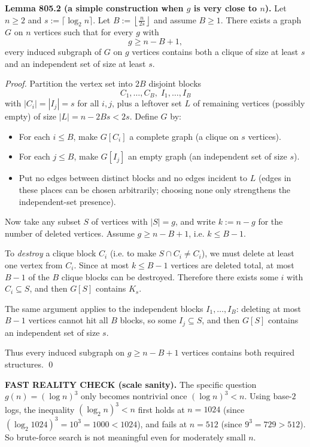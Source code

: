 \textbf{Lemma 805.2 (a simple construction when $g$ is very close to $n$).}
Let $n\ge 2$ and $s:=\lceil\log_2 n\rceil$. Let $B:=\left\lfloor \frac{n}{2s}\right\rfloor$ and assume $B\ge 1$.
There exists a graph $G$ on $n$ vertices such that for every $g$ with
\[
 g\ge n-B+1,
\]
every induced subgraph of $G$ on $g$ vertices contains both a clique of size at least $s$ and an independent set of size at least $s$.

\emph{Proof.}
Partition the vertex set into $2B$ disjoint blocks
\[
C_1,\dots,C_B,\; I_1,\dots,I_B
\]
with $|C_i|=|I_j|=s$ for all $i,j$, plus a leftover set $L$ of remaining vertices (possibly empty) of size $|L|=n-2Bs<2s$.
Define $G$ by:
\begin{itemize}
\item For each $i\le B$, make $G[C_i]$ a complete graph (a clique on $s$ vertices).
\item For each $j\le B$, make $G[I_j]$ an empty graph (an independent set of size $s$).
\item Put no edges between distinct blocks and no edges incident to $L$ (edges in these places can be chosen arbitrarily; choosing none only strengthens the independent-set presence).
\end{itemize}

Now take any subset $S$ of vertices with $|S|=g$, and write $k:=n-g$ for the number of deleted vertices.
Assume $g\ge n-B+1$, i.e. $k\le B-1$.

To \emph{destroy} a clique block $C_i$ (i.e. to make $S\cap C_i\ne C_i$), we must delete at least one vertex from $C_i$. Since at most $k\le B-1$ vertices are deleted total, at most $B-1$ of the $B$ clique blocks can be destroyed. Therefore there exists some $i$ with $C_i\subseteq S$, and then $G[S]$ contains $K_s$.

The same argument applies to the independent blocks $I_1,\dots,I_B$: deleting at most $B-1$ vertices cannot hit all $B$ blocks, so some $I_j\subseteq S$, and then $G[S]$ contains an independent set of size $s$.

Thus every induced subgraph on $g\ge n-B+1$ vertices contains both required structures.
\qed

\textbf{FAST REALITY CHECK (scale sanity).}
The specific question $g(n)=(\log n)^3$ only becomes nontrivial once $(\log n)^3<n$.
Using base-$2$ logs, the inequality $(\log_2 n)^3<n$ first holds at $n=1024$ (since $(\log_2 1024)^3=10^3=1000<1024$), and fails at $n=512$ (since $9^3=729>512$).
So brute-force search is not meaningful even for moderately small $n$.

